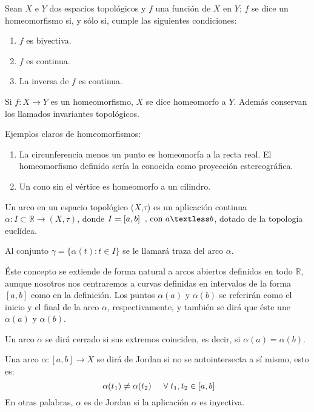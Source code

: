 \begin{definition}
	Sean $X$ e $Y$ dos espacios topológicos y $f$ una función de $X$ en $Y$; $f$ se dice un homeomorfismo si, y sólo si, cumple las siguientes condiciones:
	\begin{enumerate}
		\item $f$ es biyectiva.
		\item $f$ es continua.
		\item La inversa de $f$ es continua.
	\end{enumerate}
\end{definition}

Si $f : X \rightarrow Y$ es un homeomorfismo, $X$ se dice homeomorfo a $Y$. Además conservan los llamados invariantes topológicos.

Ejemplos claros de homeomorfismos:

\begin{enumerate}
	\item La circunferencia menos un punto es homeomorfa a la recta real. El homeomorfismo definido sería la conocida como proyección estereográfica.
	\item Un cono sin el vértice es homeomorfo a un cilindro.
\end{enumerate}

\begin{definition}
	Un arco en un espacio topológico ($X$,$\tau$) es un aplicación continua $\alpha: I\subset \mathbb{R} \rightarrow (X,\tau)$, donde $I = [a,b] \hspace{0.2cm} \text{, con } a \textless b$, dotado de la topología euclídea.
\end{definition}

Al conjunto $\gamma = \{ \alpha(t) : t \in I \}$ se le llamará traza del arco $\alpha$.

Éste concepto se extiende de forma natural a arcos abiertos definidos en todo $\mathbb{R}$, aunque nosotros nos centraremos a curvas definidas en intervalos de la forma $[a,b]$ como en la definición. Los puntos  $\alpha(a)$ y $\alpha(b)$ se referirán como el inicio y el final de la arco $\alpha$, respectivamente, y también se dirá que éste une $\alpha(a)$ y $\alpha(b)$.

\begin{definition}
	Un arco $\alpha$ se dirá cerrado si sus extremos coinciden, es decir, si $\alpha(a) = \alpha(b)$.
\end{definition}

\begin{definition}
	Una arco $\alpha\colon [a,b]\to X$ se dirá de Jordan si no se autointersecta a sí mismo, esto es:\[\ \alpha(t_1) \neq \alpha(t_2) \hspace{0.5cm}\forall \hspace{0.1cm}t_1,t_2 \in [a,b] \]
En otras palabras, $\alpha$ es de Jordan  si la aplicación $\alpha$ es inyectiva.
\end{definition}



